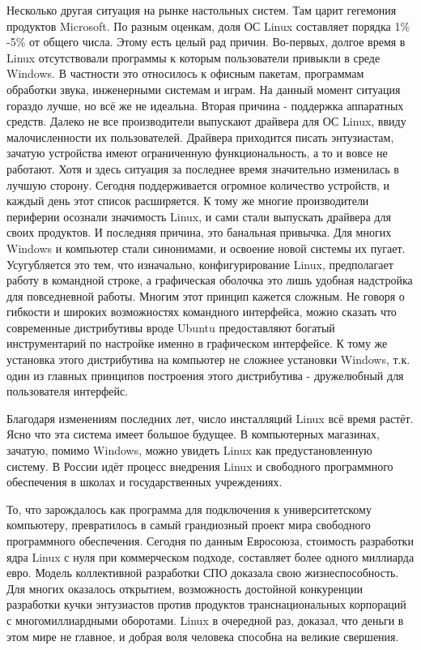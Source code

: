 \documentclass[bachelor, och, referat, times]{SCWorks}
\begin{document}
\par Несколько другая ситуация на рынке настольных систем. Там царит гегемония продуктов Microsoft. По разным оценкам, доля ОС Linux составляет порядка 1\% -5\% от общего числа. Этому есть целый рад причин. Во-первых, долгое время в Linux отсутствовали программы к которым пользователи привыкли в среде Windows. В частности это относилось к офисным пакетам, программам обработки звука, инженерными системам и играм. На данный момент ситуация гораздо лучше, но всё же не идеальна. Вторая причина - поддержка аппаратных средств. Далеко не все производители выпускают драйвера для ОС Linux, ввиду малочисленности их пользователей. Драйвера приходится писать энтузиастам, зачатую устройства имеют ограниченную функциональность, а то и вовсе не работают. Хотя и здесь ситуация за последнее время значительно изменилась в лучшую сторону. Сегодня поддерживается огромное количество устройств, и каждый день этот список расширяется. К тому же многие производители периферии осознали значимость Linux, и сами стали выпускать драйвера для своих продуктов. И последняя причина, это банальная привычка. Для многих Windows и компьютер стали синонимами, и освоение новой системы их пугает. Усугубляется это тем, что изначально, конфигурирование Linux, предполагает работу в командной строке, а графическая оболочка это лишь удобная надстройка для повседневной работы. Многим этот принцип кажется сложным. Не говоря о гибкости и широких возможностях командного интерфейса, можно сказать что современные дистрибутивы вроде Ubuntu предоставляют богатый инструментарий по настройке именно в графическом интерфейсе. К тому же установка этого дистрибутива на компьютер не сложнее установки Windows, т.к. один из главных принципов построения этого дистрибутива - дружелюбный для пользователя интерфейс.
\par Благодаря изменениям последних лет, число инсталляций Linux всё время растёт. Ясно что эта система имеет большое будущее. В компьютерных магазинах, зачатую, помимо Windows, можно увидеть Linux как предустановленную систему. В России идёт процесс внедрения Linux и свободного программного обеспечения в школах и государственных учреждениях.

\conclusion
То, что зарождалось как программа для подключения к университетскому компьютеру, превратилось в самый грандиозный проект мира свободного программного обеспечения. Сегодня по данным Евросоюза, стоимость разработки ядра Linux с нуля при коммерческом подходе, составляет более одного миллиарда евро. Модель коллективной разработки СПО доказала свою жизнеспособность. Для многих оказалось открытием, возможность достойной конкуренции разработки кучки энтузиастов против продуктов транснациональных корпораций с многомиллиардными оборотами. Linux в очередной раз, доказал, что деньги в этом мире не главное, и добрая воля человека способна на великие свершения.
\end{document}
